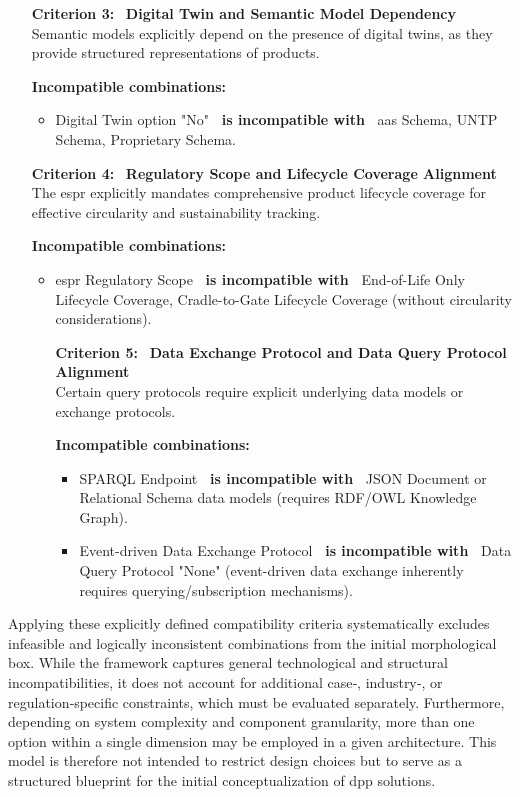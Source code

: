 \begin{enumerate}[itemsep=0.5\baselineskip]
    \item[\textbf{Criterion 3:}] ~\textbf{Digital Twin and Semantic Model Dependency}\\
    Semantic models explicitly depend on the presence of digital twins, as they provide structured representations of products.
    
    \textbf{Incompatible combinations:}
    \begin{itemize}
        \item Digital Twin option "No" \textbf{~is incompatible with~} \ac{aas} Schema, UNTP Schema, Proprietary Schema.
    \end{itemize}

    \item[\textbf{Criterion 4:}] ~\textbf{Regulatory Scope and Lifecycle Coverage Alignment}\\
    The \ac{espr} explicitly mandates comprehensive product lifecycle coverage for effective circularity and sustainability tracking.
    
    \textbf{Incompatible combinations:}
    \begin{itemize}
        \item \ac{espr} Regulatory Scope \textbf{~is incompatible with~} End-of-Life Only Lifecycle Coverage, Cradle-to-Gate Lifecycle Coverage (without circularity considerations).

    \item[\textbf{Criterion 5:}] ~\textbf{Data Exchange Protocol and Data Query Protocol Alignment}\\
    Certain query protocols require explicit underlying data models or exchange protocols.
    
    \textbf{Incompatible combinations:}
    \begin{itemize}
        \item SPARQL Endpoint \textbf{~is incompatible with~} JSON Document or Relational Schema data models (requires RDF/OWL Knowledge Graph).
        \item Event-driven Data Exchange Protocol \textbf{~is incompatible with~} Data Query Protocol "None" (event-driven data exchange inherently requires querying/subscription mechanisms).
    \end{itemize}
    \end{itemize}
\end{enumerate}

Applying these explicitly defined compatibility criteria systematically excludes infeasible and logically inconsistent combinations from the initial morphological box. While the framework captures general technological and structural incompatibilities, it does not account for additional case‑, industry‑, or regulation‑specific constraints, which must be evaluated separately. Furthermore, depending on system complexity and component granularity, more than one option within a single dimension may be employed in a given architecture. This model is therefore not intended to restrict design choices but to serve as a structured blueprint for the initial conceptualization of \ac{dpp} solutions.

